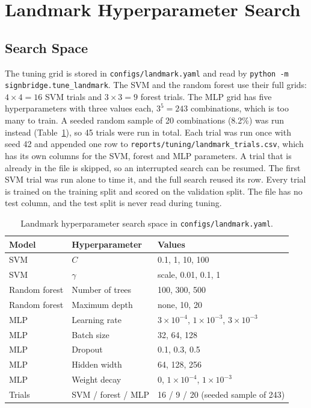 \section{Landmark Hyperparameter Search}
\label{sec:landmark-hyperparameters}

\subsection{Search Space}

The tuning grid is stored in \texttt{configs/landmark.yaml} and read by \texttt{python -m signbridge.tune\_landmark}. The SVM and the random forest use their full grids: $4\times4=16$ SVM trials and $3\times3=9$ forest trials. The MLP grid has five hyperparameters with three values each, $3^5=243$ combinations, which is too many to train. A seeded random sample of 20 combinations (8.2\%) was run instead (Table~\ref{tab:landmark-search-space}), so 45 trials were run in total. Each trial was run once with seed 42 and appended one row to \texttt{reports/tuning/landmark\_trials.csv}, which has its own columns for the SVM, forest and MLP parameters. A trial that is already in the file is skipped, so an interrupted search can be resumed. The first SVM trial was run alone to time it, and the full search reused its row. Every trial is trained on the training split and scored on the validation split. The file has no test column, and the test split is never read during tuning.

\begin{table}[htbp]
\centering
\caption{Landmark hyperparameter search space in \texttt{configs/landmark.yaml}.}
\label{tab:landmark-search-space}
\begin{tabular}{lll}
\toprule
Model & Hyperparameter & Values \\
\midrule
SVM & $C$ & 0.1, 1, 10, 100 \\
SVM & $\gamma$ & scale, 0.01, 0.1, 1 \\
Random forest & Number of trees & 100, 300, 500 \\
Random forest & Maximum depth & none, 10, 20 \\
MLP & Learning rate & $3\times10^{-4}$, $1\times10^{-3}$, $3\times10^{-3}$ \\
MLP & Batch size & 32, 64, 128 \\
MLP & Dropout & 0.1, 0.3, 0.5 \\
MLP & Hidden width & 64, 128, 256 \\
MLP & Weight decay & 0, $1\times10^{-4}$, $1\times10^{-3}$ \\
\midrule
Trials & SVM / forest / MLP & 16 / 9 / 20 (seeded sample of 243) \\
\bottomrule
\end{tabular}
\end{table}

